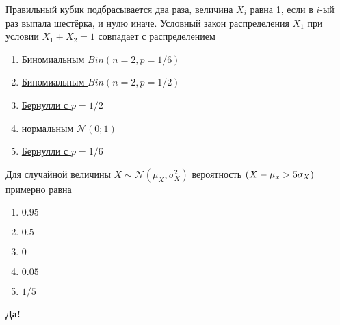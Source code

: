 \documentclass[t]{beamer}
\let\P\relax
\DeclareMathOperator{\P}{\mathbb{P}}
\newcommand{\cN}{\mathcal{N}}
\begin{document}
 \begin{frame} \label{40} 
\begin{block}{40} 

Правильный кубик подбрасывается два раза, величина $X_i$ равна 1, если в $i$-ый раз выпала шестёрка, и нулю иначе. Условный закон распределения $X_1$ при условии $X_1+X_2=1$ совпадает с распределением


 \end{block} 
\begin{enumerate} 
\item[] \hyperlink{40-No}{\beamergotobutton{}  Биномиальным $Bin(n=2, p=1/6)$ }
\item[] \hyperlink{40-No}{\beamergotobutton{}  Биномиальным $Bin(n=2, p=1/2)$ }
\item[] \hyperlink{40-Yes}{\beamergotobutton{}  Бернулли с $p=1/2$ }
\item[] \hyperlink{40-No}{\beamergotobutton{}  нормальным $\cN(0;1)$ }
\item[] \hyperlink{40-No}{\beamergotobutton{}  Бернулли с $p=1/6$ }
\end{enumerate} 
\end{frame} 


 \begin{frame} \label{1-Yes} 
\begin{block}{1} 

  Для случайной величины $X \sim \cN(\mu_X, \sigma^2_X)$ вероятность $\P(X - \mu_x > 5\sigma_X)$  примерно равна
  


 \end{block} 
\begin{enumerate} 
\item[] \hyperlink{1-No}{\beamergotobutton{} $0.95$}
\item[] \hyperlink{1-No}{\beamergotobutton{} $0.5$}
\item[] \hyperlink{1-Yes}{\beamergotobutton{} $0$}
\item[] \hyperlink{1-No}{\beamergotobutton{} $0.05$}
\item[] \hyperlink{1-No}{\beamergotobutton{} $1/5$}
\end{enumerate} 

 \textbf{Да!} 
 \hyperlink{2}{}\end{frame} 
\end{document}
